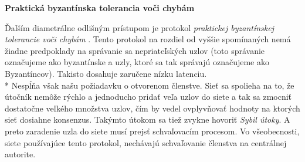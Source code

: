 \newpage

\begin{flushleft}\textbf {Praktická byzantínska tolerancia voči chybám}\end{flushleft}
\vspace{-4mm}
Ďalším diametrálne odlišným prístupom je protokol \textit{praktickej byzantínskej
tolerancie voči chybám} \cite{castro1999practical}.
Tento protokol na rozdiel od vyššie spomínaných nemá žiadne predpoklady na
správanie sa nepriateľských uzlov (toto správanie označujeme ako byzantínske a uzly,
ktoré sa tak správajú označujeme ako Byzantíncov).
Takisto dosahuje zaručene nízku latenciu.
\\*
Nespĺňa však našu požiadavku o otvorenom členstve. Sieť sa spolieha na to, že
útočník nemôže rýchlo a jednoducho pridať veľa uzlov do siete a tak sa
zmocniť dostatočne veľkého množstva uzlov, čím by vedel ovplyvňovať hodnoty na ktorých
sieť dosiahne konsenzus.
Takýmto útokom sa tiež zvykne hovoriť \textit{Sybil útoky}.
A preto zaradenie uzla do siete musí prejsť schvaľovacím procesom.
Vo všeobecnosti, siete používajúce tento protokol, nechávajú schvaľovanie
členstva na centrálnej autorite.